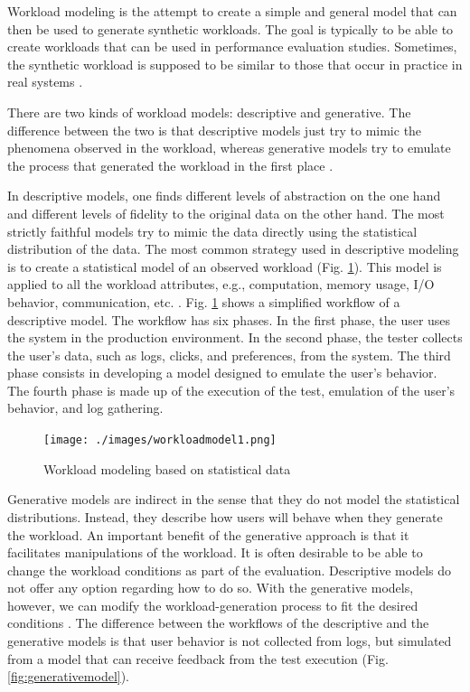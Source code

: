 \documentclass[conference]{IEEEtran}
\begin{document}
Workload modeling is the attempt to create a simple and general model that can then be used to generate synthetic workloads. The goal is typically to be able to create workloads that can be used in performance evaluation studies. Sometimes, the synthetic workload is supposed to be similar to those that occur in practice in real systems \cite{Feitelson2013} \cite{Molyneaux2009}.

There are two kinds of workload models: descriptive and generative. The difference between the two is that descriptive models just try to mimic the phenomena observed in the workload, whereas generative models try to emulate the process that generated the workload in the first place \cite{DiLucca2006}. 

In descriptive models, one finds different levels of abstraction on the one hand and different levels of fidelity to the original data on the other hand. The most strictly faithful models try to mimic the data directly using the statistical distribution of the data. The most common strategy used in descriptive modeling is to create a statistical model of an observed workload (Fig. \ref{fig:descriptivemodel}). This model is applied to all the workload attributes, e.g., computation, memory usage, I/O behavior, communication, etc. \cite{DiLucca2006}. Fig. \ref{fig:descriptivemodel} shows a simplified workflow of a descriptive model. The workflow has six phases. In the first phase, the user uses the system in the production environment. In the second phase, the tester collects the user's data, such as logs, clicks, and preferences, from the system. The third phase consists in developing a model designed to emulate the user's behavior. The fourth phase is made up of the execution of the test, emulation of the user's behavior, and log gathering.



\begin{figure}[!ht]
\centering
\texttt{[image: ./images/workloadmodel1.png]}
\caption{Workload modeling based on statistical data \cite{DiLucca2006}}
\label{fig:descriptivemodel}
\end{figure}

Generative models are indirect in the sense that they do not model the statistical distributions. Instead, they describe how users will behave when they generate the workload. An important benefit of the generative approach is that it facilitates manipulations of the workload. It is often desirable to be able to change the workload conditions as part of the evaluation. Descriptive models do not offer any option regarding how to do so. With the generative models, however, we can modify the workload-generation process to fit the desired conditions \cite{DiLucca2006}. The difference between the workflows of the descriptive and the generative models is that user behavior is not collected from logs, but simulated from a model that can receive feedback from the test execution (Fig. \ref{fig:generativemodel}).
\end{document}
